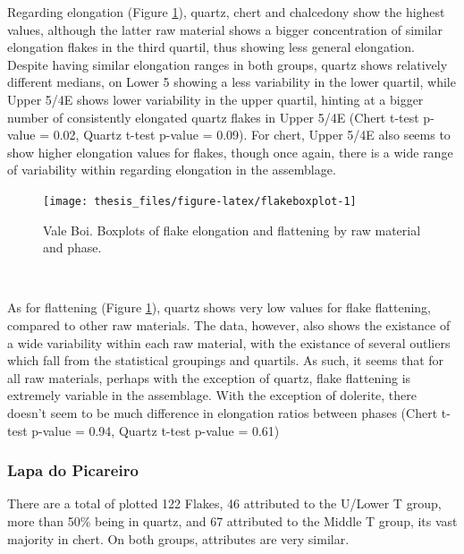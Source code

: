 \documentclass[12pt,twoside]{reedthesis}
\begin{document}
Regarding elongation (Figure \ref{fig:flakeboxplot}), quartz, chert and chalcedony show the highest values, although the latter raw material shows a bigger concentration of similar elongation flakes in the third quartil, thus showing less general elongation. Despite having similar elongation ranges in both groups, quartz shows relatively different medians, on Lower 5 showing a less variability in the lower quartil, while Upper 5/4E shows lower variability in the upper quartil, hinting at a bigger number of consistently elongated quartz flakes in Upper 5/4E (Chert t-test p-value = 0.02, Quartz t-test p-value = 0.09). For chert, Upper 5/4E also seems to show higher elongation values for flakes, though once again, there is a wide range of variability within regarding elongation in the assemblage.
\begin{figure}[H]

{\centering \texttt{[image: thesis\_files/figure-latex/flakeboxplot-1]} 

}

\caption{Vale Boi. Boxplots of flake elongation and flattening by raw material and phase.}\label{fig:flakeboxplot}
\end{figure}
~

As for flattening (Figure \ref{fig:flakeboxplot}), quartz shows very low values for flake flattening, compared to other raw materials. The data, however, also shows the existance of a wide variability within each raw material, with the existance of several outliers which fall from the statistical groupings and quartils. As such, it seems that for all raw materials, perhaps with the exception of quartz, flake flattening is extremely variable in the assemblage. With the exception of dolerite, there doesn't seem to be much difference in elongation ratios between phases (Chert t-test p-value = 0.94, Quartz t-test p-value = 0.61)

\hypertarget{lapa-do-picareiro-5}{%
\subsubsection{Lapa do Picareiro}\label{lapa-do-picareiro-5}}

There are a total of plotted 122 Flakes, 46 attributed to the U/Lower T group, more than 50\% being in quartz, and 67 attributed to the Middle T group, its vast majority in chert. On both groups, attributes are very similar.
\end{document}
